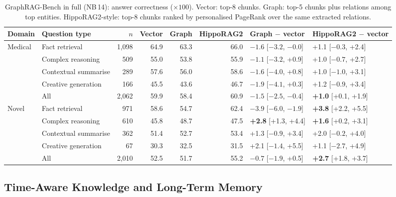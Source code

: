 \documentclass[11pt,a4paper]{article}
\newcommand{\nb}[1]{NB\,#1}
\begin{document}
\begin{table}[t]
\centering
\small
\caption{GraphRAG-Bench in full (\nb{14}): answer correctness ($\times 100$). Vector: top-8 chunks. Graph: top-5
chunks plus relations among top entities. HippoRAG2-style: top-8 chunks ranked by personalised
PageRank over the same extracted relations.}
\label{tab:grb}
\footnotesize\setlength{\tabcolsep}{3.2pt}
\begin{tabular}{@{}llrrrrll@{}}
\toprule
Domain & Question type & $n$ & Vector & Graph & HippoRAG2 & Graph $-$ vector & HippoRAG2 $-$ vector \\
\midrule
\multirow{5}{*}{Medical}
 & Fact retrieval & 1{,}098 & 64.9 & 63.3 & 66.0 & $\mathbf{-1.6}$ [$-3.2$, $-0.0$] & +1.1 [$-0.3$, +2.4] \\
 & Complex reasoning & 509 & 55.0 & 53.8 & 55.9 & $-1.1$ [$-3.2$, +0.9] & +1.0 [$-0.7$, +2.7] \\
 & Contextual summarise & 289 & 57.6 & 56.0 & 58.6 & $-1.6$ [$-4.0$, +0.8] & +1.0 [$-1.0$, +3.1] \\
 & Creative generation & 166 & 45.5 & 43.6 & 46.7 & $-1.9$ [$-4.1$, +0.3] & +1.2 [$-0.9$, +3.4] \\
 & All & 2{,}062 & 59.9 & 58.4 & 60.9 & $\mathbf{-1.5}$ [$-2.5$, $-0.4$] & \textbf{+1.0} [+0.1, +1.9] \\
\midrule
\multirow{5}{*}{Novel}
 & Fact retrieval & 971 & 58.6 & 54.7 & 62.4 & $\mathbf{-3.9}$ [$-6.0$, $-1.9$] & \textbf{+3.8} [+2.2, +5.5] \\
 & Complex reasoning & 610 & 45.8 & 48.7 & 47.5 & \textbf{+2.8} [+1.3, +4.4] & \textbf{+1.6} [+0.2, +3.1] \\
 & Contextual summarise & 362 & 51.4 & 52.7 & 53.4 & +1.3 [$-0.9$, +3.4] & +2.0 [$-0.2$, +4.0] \\
 & Creative generation & 67 & 30.3 & 32.5 & 31.5 & +2.1 [$-1.4$, +5.5] & +1.1 [$-2.7$, +4.9] \\
 & All & 2{,}010 & 52.5 & 51.7 & 55.2 & $-0.7$ [$-1.9$, +0.5] & \textbf{+2.7} [+1.8, +3.7] \\
\bottomrule
\end{tabular}
\end{table}

\subsection{Time-Aware Knowledge and Long-Term Memory}
\label{sec:memory}
\end{document}
